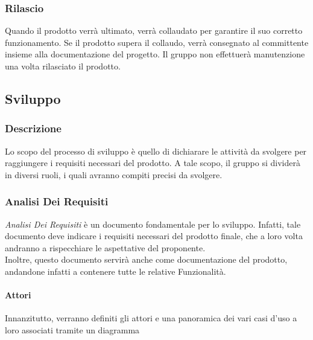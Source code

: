 \subsubsection{Rilascio}
Quando il prodotto verrà ultimato, verrà collaudato per garantire il suo corretto funzionamento. Se il prodotto supera il collaudo, verrà consegnato al committente insieme alla documentazione del progetto. 
Il gruppo non effettuerà manutenzione una volta rilasciato il prodotto.

\subsection{Sviluppo}
\subsubsection{Descrizione}
Lo scopo del processo di sviluppo è quello di dichiarare le attività da svolgere per raggiungere i requisiti necessari del prodotto.
A tale scopo, il gruppo si dividerà in diversi ruoli, i quali avranno compiti precisi da svolgere.
\subsubsection{Analisi Dei Requisiti}
\textit{Analisi Dei Requisiti} è un documento fondamentale per lo sviluppo. Infatti, tale documento deve indicare i requisiti necessari del prodotto finale, che a loro volta andranno a rispecchiare le aspettative del proponente. \\
Inoltre, questo documento servirà anche come documentazione del prodotto, andandone infatti a contenere tutte le relative Funzionalità.
\paragraph{Attori} 
Innanzitutto, verranno definiti gli attori e una panoramica dei vari casi d'uso a loro associati tramite un diagramma
